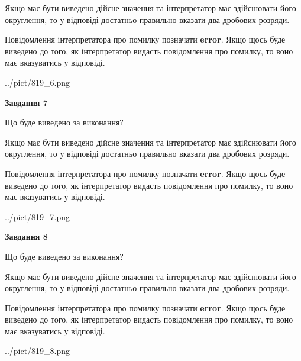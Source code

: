 \documentclass[12pt, ukrainian]{article}
\begin{document}
{\begin {Large}
Якщо має бути виведено дійсне значення та інтерпретатор має здійснювати його округлення, 
то у відповіді достатньо правильно вказати два дробових розряди.

Повідомлення інтерпретатора про помилку позначати \textbf{error}.
Якщо щось буде виведено до того, як інтерпретатор видасть повідомлення про помилку, 
то воно має вказуватись у відповіді. \par

\begin{center}
	{../pict/819_6.png}
\end{center}
\newpage

{\begin {center}\textbf{Завдання 7}\end {center}}\par
Що буде виведено за виконання? \par

Якщо має бути виведено дійсне значення та інтерпретатор має здійснювати його округлення, 
то у відповіді достатньо правильно вказати два дробових розряди.

Повідомлення інтерпретатора про помилку позначати \textbf{error}.
Якщо щось буде виведено до того, як інтерпретатор видасть повідомлення про помилку, 
то воно має вказуватись у відповіді. \par

\begin{center}
	{../pict/819_7.png}
\end{center}
\newpage

{\begin {center}\textbf{Завдання 8}\end {center}}\par
Що буде виведено за виконання? \par

Якщо має бути виведено дійсне значення та інтерпретатор має здійснювати його округлення, 
то у відповіді достатньо правильно вказати два дробових розряди.

Повідомлення інтерпретатора про помилку позначати \textbf{error}.
Якщо щось буде виведено до того, як інтерпретатор видасть повідомлення про помилку, 
то воно має вказуватись у відповіді. \par

\begin{center}
	{../pict/819_8.png}
\end{center}
\newpage


\end{Large}}
\end{document}
